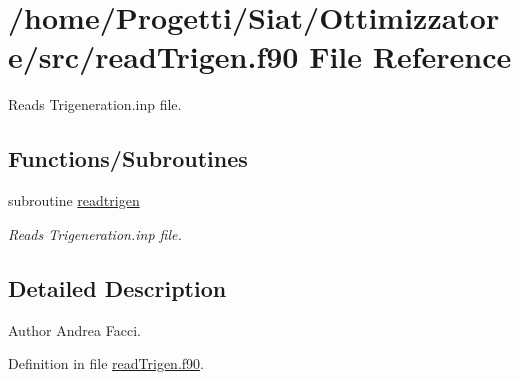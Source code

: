 \hypertarget{read_trigen_8f90}{\section{/home/\-Progetti/\-Siat/\-Ottimizzatore/src/read\-Trigen.f90 File Reference}
\label{read_trigen_8f90}
}


Reads Trigeneration.\-inp file.  


\subsection*{Functions/\-Subroutines}
\begin{DoxyCompactItemize}
\item 
subroutine \hyperlink{read_trigen_8f90_a2048dd756a11560009d65015dc03f317}{readtrigen}
\begin{DoxyCompactList}\small\item\em Reads Trigeneration.\-inp file. \end{DoxyCompactList}\end{DoxyCompactItemize}


\subsection{Detailed Description}
\begin{DoxyAuthor}{Author}
Andrea Facci. 
\end{DoxyAuthor}


Definition in file \hyperlink{read_trigen_8f90_source}{read\-Trigen.\-f90}.



